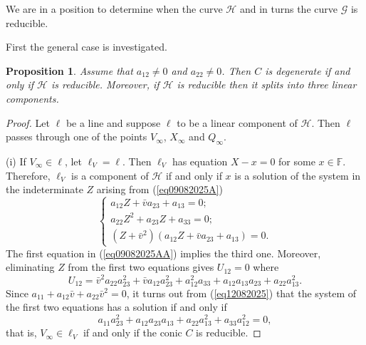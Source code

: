 \documentclass[sn-mathphys-num]{sn-jnl}%
\newtheorem{proposition}[theorem]{Proposition}
\begin{document}
We are in a position to determine when the curve $\mathcal{H}$ and in turns the curve $\mathcal{G}$ is reducible.

First the general case is investigated.
\begin{proposition}
\label{pro12082025} Assume that $a_{12}\ne 0$ and $a_{22}\ne 0$. Then $C$ is degenerate if and only if $\mathcal{H}$ is reducible. Moreover, if $\mathcal{H}$ is reducible then it splits into three linear components.
\end{proposition}
\begin{proof}
Let $\ell$ be a line and suppose $\ell$ to be a linear component of $\mathcal{H}$. Then $\ell$ passes through one of the points $V_\infty$, $X_\infty$ and $Q_\infty$.

(i)
If $V_\infty\in \ell$, let $\ell_V=\ell$. Then $\ell_V$ has equation $X-x=0$ for some $x\in \mathbb{F}$. Therefore, $\ell_V$ is a component of $\mathcal{H}$ if and only if $x$ is a solution of the system in the indeterminate $Z$ arising from (\ref{eq09082025A})
\begin{equation}
\label{eq09082025AA}
\begin{cases}
a_{12}Z+\bar{v}a_{23}+a_{13}=0;\\
a_{22}Z^2+a_{23}Z+a_{33}=0;\\
(Z+\bar{v}^2)(a_{12}Z+\bar{v}a_{23}+a_{13})=0.
\end{cases}
\end{equation}
 The first equation in (\ref{eq09082025AA}) implies the third one.
 Moreover, eliminating $Z$ from the first two equations gives $U_{12}=0$ where
\begin{equation}
\label{eq12082025}
U_{12}=\bar{v}^2a_{22}a_{23}^2+\bar{v}a_{12}a_{23}^2+a_{12}^2a_{33}+a_{12}a_{13}a_{23}+a_{22}a_{13}^2.
\end{equation}
Since $a_{11}+a_{12}\bar{v}+a_{22}\bar{v}^2=0$, it turns out from (\ref{eq12082025}) that the system of the first two equations has a solution if and only if
$$a_{11}a_{23}^2+a_{12}a_{23}a_{13}+a_{22}a_{13}^2+a_{33}a_{12}^2=0,$$
that is, $V_\infty\in \ell_V$ if and only if the conic $C$ is reducible.


\end{proof}
\end{document}
